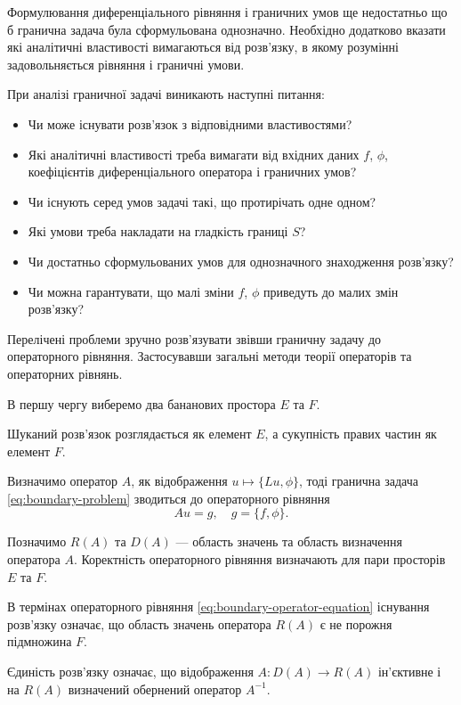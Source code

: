 Формулювання диференціального рівняння і граничних умов ще недостатньо що б гранична задача була сформульована однозначно. Необхідно додатково вказати які аналітичні властивості вимагаються від розв’язку, в якому розумінні задовольняється рівняння і граничні умови. \medskip

При аналізі граничної задачі виникають наступні питання:
\begin{itemize}
    \item Чи може існувати розв'язок з відповідними властивостями?
    \item Які аналітичні властивості треба вимагати від вхідних даних $f$, $\phi$, коефіцієнтів диференціального оператора і граничних умов?
    \item Чи існують серед умов задачі такі, що протирічать одне одном?
    \item Які умови треба накладати на гладкість границі $S$?
    \item Чи достатньо сформульованих умов для однозначного знаходження розв’язку?
    \item Чи можна гарантувати, що малі зміни $f$, $\phi$ приведуть до малих змін розв'язку?
\end{itemize}

Перелічені проблеми зручно розв'язувати звівши граничну задачу до операторного рівняння. Застосувавши загальні методи теорії операторів та операторних рівнянь. \medskip

В першу чергу виберемо два бананових простора $E$ та $F$. \medskip

Шуканий розв'язок розглядається як елемент $E$, а сукупність правих частин як елемент $F$. \medskip

Визначимо оператор $A$, як відображення $u \mapsto \{Lu, \phi\}$, тоді гранична задача
\eqref{eq:boundary-problem} зводиться до операторного рівняння
\begin{equation}
    \label{eq:boundary-operator-equation}
    A u = g, \quad g = \{f, \phi\}.
\end{equation}

Позначимо $R(A)$ та $D(A)$ --- область значень та область визначення оператора $A$. Коректність операторного рівняння визначають для пари просторів $E$ та $F$. \medskip

В термінах операторного рівняння \eqref{eq:boundary-operator-equation} існування розв'язку означає, що область значень оператора $R(A)$ є не порожня підмножина $F$. \medskip

Єдиність розв'язку означає, що відображення $A: D(A) \to R(A)$ ін'єктивне і на $R(A)$ визначений обернений оператор $A^{-1}$.

